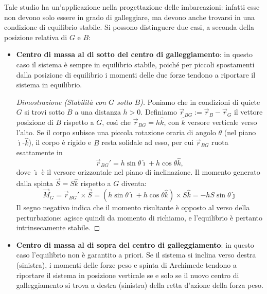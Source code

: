 \documentclass[11pt, a4paper, openright]{book}
\theoremstyle{plain}
\theoremstyle{definition}
\begin{document}
Tale studio ha un'applicazione nella progettazione delle imbarcazioni: infatti esse non devono solo essere in grado di galleggiare, ma devono anche trovarsi in una condizione di equilibrio stabile. Si possono distinguere due casi, a seconda della posizione relativa di $G$ e $B$:
\begin{itemize}
    \item \textbf{Centro di massa al di sotto del centro di galleggiamento}: in questo caso il sistema è sempre in equilibrio stabile, poiché per piccoli spostamenti dalla posizione di equilibrio i momenti delle due forze tendono a riportare il sistema in equilibrio.
    
    \begin{proof}[Dimostrazione (Stabilità con $G$ sotto $B$)]
    Poniamo che in condizioni di quiete $G$ si trovi sotto $B$ a una distanza $h > 0$. Definiamo $\vec{r}_{BG} := \vec{r}_B - \vec{r}_G$ il vettore posizione di $B$ rispetto a $G$, così che $\vec{r}_{BG} = h\hat{k}$, con $\hat{k}$ versore verticale verso l'alto.
    Se il corpo subisce una piccola rotazione oraria di angolo $\theta$ (nel piano $\hat\imath$-$\hat k$), il corpo è rigido e $B$ resta solidale ad esso, per cui $\vec{r}_{BG}$ ruota esattamente in
    $$ \vec{r}_{BG}' = h\sin\theta\hat{\imath} + h\cos\theta\hat{k}, $$
    dove $\hat{\imath}$ è il versore orizzontale nel piano di inclinazione. Il momento generato dalla spinta $\vec{S} = S\hat{k}$ rispetto a $G$ diventa:
    $$ \vec{M}_G = \vec{r}_{BG}' \times \vec{S} = (h\sin\theta\hat{\imath} + h\cos\theta\hat{k}) \times S\hat{k} = -hS\sin\theta\hat{\jmath} \label{eq:momento_stabilita} $$
    Il segno negativo indica che il momento risultante è opposto al verso della perturbazione: agisce quindi da momento di richiamo, e l'equilibrio è pertanto intrinsecamente stabile.
    \end{proof}
    
    \item \textbf{Centro di massa al di sopra del centro di galleggiamento}: in questo caso l'equilibrio non è garantito a priori. Se il sistema si inclina verso destra (sinistra), i momenti delle forze peso e spinta di Archimede tendono a riportare il sistema in posizione verticale se e solo se il nuovo centro di galleggiamento si trova a destra (sinistra) della retta d'azione della forza peso.
    

\end{itemize}
\end{document}
